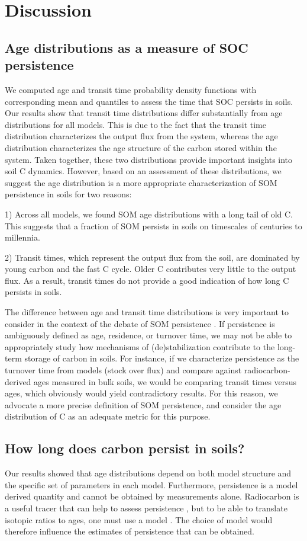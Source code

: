 \documentclass[draft,linenumbers]{agujournal}
\begin{document}
\section{Discussion}
\subsection{Age distributions as a measure of SOC persistence}

We computed age and transit time probability density functions with corresponding mean and quantiles to assess the time that SOC persists in soils. Our results show that transit time distributions differ substantially from age distributions for all models. This is due to the fact that the transit time distribution characterizes the output flux from the system, whereas the age distribution characterizes the age structure of the carbon stored within the system. Taken together, these two distributions provide important insights into soil C dynamics. However, based on an assessment of these distributions, we suggest the age distribution is a more appropriate characterization of SOM persistence in soils for two reasons:

1)	Across all models, we found SOM age distributions with a long tail of old C. This suggests that a fraction of SOM persists in soils on timescales of centuries to millennia. 

2)	Transit times, which represent the output flux from the soil, are dominated by young carbon and the fast C cycle. Older C contributes very little to the output flux. As a result, transit times do not provide a good indication of how long C persists in soils.

The difference between age and transit time distributions is very important to consider in the context of the debate of SOM persistence \citep{Schmidt2011, Dungait2012, LehmannKleber}. If persistence is ambiguously defined as age, residence, or turnover time, we may not be able to appropriately study how mechanisms of (de)stabilization contribute to the long-term storage of carbon in soils. For instance, if we characterize persistence as the turnover time from models (stock over flux) and compare against radiocarbon-derived ages measured in bulk soils, we would be comparing transit times versus ages, which obviously would yield contradictory results. For this reason, we advocate a more precise definition of SOM persistence, and consider the age distribution of C as an adequate metric for this purpose.

\subsection{How long does carbon persist in soils?}
Our results showed that age distributions depend on both model structure and the specific set of parameters in each model. Furthermore, persistence is a model derived quantity and cannot be obtained by measurements alone. Radiocarbon is a useful tracer that can help to assess persistence \citep{Trumbore2000, Trumbore2009}, but to be able to translate isotopic ratios to ages, one must use a model \citep{Trumbore2016}. The choice of model would therefore influence the estimates of persistence that can be obtained.
\end{document}
